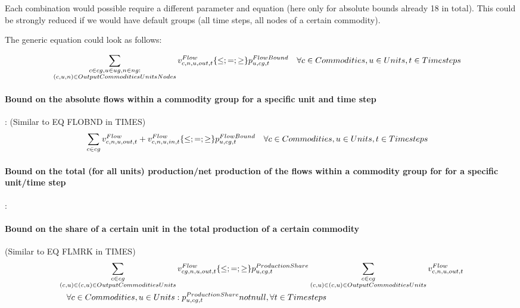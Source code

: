 Each combination would possible require a different parameter and equation (here only for absolute bounds already 18 in total). This could be strongly reduced if we would have default groups (all time steps, all nodes of a certain commodity).

The generic equation could look as follows:

\begin{align} \label{eq:flowbound}
&\sum_{\substack{\commodity \in cg, \unit \in ug, \node \in ng: \\ \OutputCommoditiesUnitsNodes}} \vFlow[\commodity,\node,\unit,out,\timestep]  \{\le;=;\ge\} \pFlowBound \quad \forall \commodities, \units, \timesteps
\end{align}


\paragraph{Bound on the absolute flows within a commodity group for a specific unit and time step}:
(Similar to EQ FLOBND in TIMES)
\begin{align} \label{eq:flowboundgeneric}
&\sum_{\commodity \in cg} \vFlow[\commodity,\node,\unit,out,\timestep] + \vFlow[\commodity,\node,\unit,in,\timestep]  \{\le;=;\ge\} \pFlowBound \quad \forall \commodities, \units, \timesteps
\end{align}

\paragraph{Bound on the total (for all units) production/net production of the flows within a commodity group for for a specific unit/time step}:


\paragraph{Bound on the share of a certain unit in the total production of a certain commodity}
(Similar to EQ FLMRK in TIMES)
\begin{align} \label{eq:productionshare}
&\sum_{\substack{\commodity \in cg \\ (\commodity,\unit) \in \OutputCommoditiesUnits}} \vFlow[cg,\node,\unit,out,\timestep] \{\le;=;\ge\} \pProductionShare \sum_{\substack{\commodity \in cg \\ (\commodity,\unit) \in \OutputCommoditiesUnits}} \vFlow[\commodity,\node, \unit,out,\timestep] \nonumber \\
&\quad \forall \commodities, \units : \pProductionShare not null, \forall \timesteps
\end{align}

